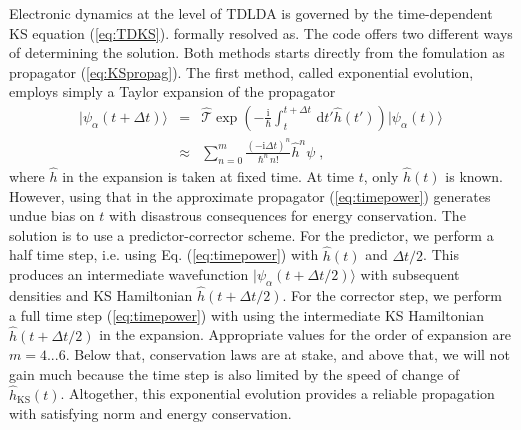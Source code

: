 \documentclass[final,1p]{elsarticle}
\newcommand{\I}{\mathrm{i}}
\newcommand{\D}{\mathrm{d}}
\begin{document}
Electronic dynamics at the level of TDLDA is governed by the
time-dependent KS equation (\ref{eq:TDKS}).  formally resolved as. The
code offers two different ways of determining the solution. Both
methods starts directly from the fomulation as propagator
(\ref{eq:KSpropag}). The first method, called exponential evolution,
employs simply a Taylor expansion of the propagator
\begin{eqnarray}
  |\psi_\alpha(t\!+\!\Delta t)\rangle
  &=&
  \hat{\mathcal{T}}\exp\left(-\frac{\I}{\hbar}
   \int_t^{t+\Delta t}\,\D t'\hat h(t')\right)
  |\psi_\alpha(t)\rangle
\nonumber\\
  &\approx&
  \sum_{n=0}^m
  \frac{(-\I\Delta t)^n}{\hbar^n\,n!}\hat{h}^n\psi\;,
  \label{eq:timepower}
\end{eqnarray}
where $\hat{h}$ in the expansion is taken at fixed time.  At time $t$,
only $\hat{h}(t)$ is known. However, using that in the approximate
propagator (\ref{eq:timepower}) generates undue bias on $t$ with
disastrous consequences for energy conservation. The solution is to
use a predictor-corrector scheme. For the predictor, we perform a half
time step, i.e. using Eq. (\ref{eq:timepower}) with $\hat{h}(t)$ and
$\Delta t/2$. This produces an intermediate wavefunction
$|\psi_\alpha(t\!+\!\Delta t/2)\rangle$ with subsequent densities and
KS Hamiltonian $\hat{h}(t\!+\!\Delta t/2)$. For the corrector step, we
perform a full time step (\ref{eq:timepower}) with using the
intermediate KS Hamiltonian $\hat{h}(t\!+\!\Delta t/2)$ in the
expansion. Appropriate values for the order of expansion are
$m=4...6$. Below that, conservation laws are at stake, and above that,
we will not gain much because the time step is also limited by the
speed of change of $\hat{h}_\mathrm{KS}(t)$. Altogether, this
exponential evolution provides a reliable propagation with satisfying
norm and energy conservation.
\end{document}
